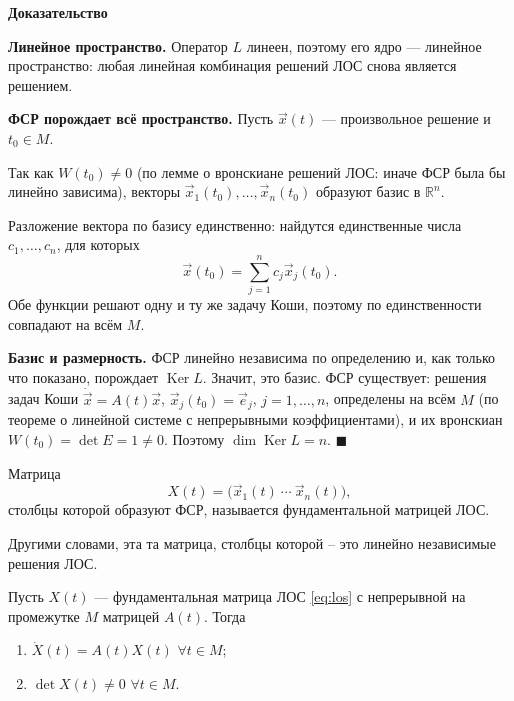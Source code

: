 \documentclass[12pt,a4paper]{article}
\numberwithin{equation}{section}
\newcommand{\vect}[1]{\vec{#1}}
\renewenvironment{proof}[1][Доказательство]{\begin{center}\textbf{#1}\end{center}}{\hfill$\blacksquare$\par}
\begin{document}
\begin{proof}
\textbf{Линейное пространство.} Оператор $L$ линеен, поэтому его ядро --- линейное пространство: любая линейная комбинация решений ЛОС снова является решением.

\textbf{ФСР порождает всё пространство.} Пусть $\vect{x}(t)$ --- произвольное решение и $t_0\in M$.

Так как \(W(t_0)\neq0\) (по лемме о вронскиане решений ЛОС: иначе ФСР была бы линейно зависима), векторы $\vect{x}_1(t_0),\ldots,\vect{x}_n(t_0)$ образуют базис в \(\mathbb{R}^n\).

Разложение вектора по базису единственно: найдутся единственные числа $c_1,\ldots,c_n$, для которых
\[
\vect{x}(t_0)=\sum_{j=1}^{n}c_j\vect{x}_j(t_0).
\]
Обе функции решают одну и ту же задачу Коши, поэтому по единственности совпадают на всём $M$.

\textbf{Базис и размерность.} ФСР линейно независима по определению и, как только что показано, порождает \(\operatorname{Ker}L\). Значит, это базис. ФСР существует: решения задач Коши \(\dot{\vect{x}}=A(t)\vect{x}\), \(\vect{x}_j(t_0)=\vect{e}_j\), \(j=1,\ldots,n\), определены на всём \(M\) (по теореме о линейной системе с непрерывными коэффициентами), и их вронскиан \(W(t_0)=\det E=1\neq0\). Поэтому \(\dim\operatorname{Ker}L=n\).
\end{proof}

\begin{definitionHSE}
Матрица
\[
X(t)=\bigl(\vect{x}_1(t)\ \cdots\ \vect{x}_n(t)\bigr),
\]
столбцы которой образуют ФСР, называется фундаментальной матрицей ЛОС.
\end{definitionHSE}
Другими словами, эта та матрица, столбцы которой -- это линейно независимые решения ЛОС.

\begin{theoremHSE}
Пусть $X(t)$ --- фундаментальная матрица ЛОС \eqref{eq:los} с непрерывной на промежутке $M$ матрицей $A(t)$. Тогда
\begin{enumerate}
\item \(\dot X(t)=A(t)X(t)\) \(\forall t\in M\);
\item \(\det X(t)\neq0\) \(\forall t\in M\).
\end{enumerate}
\end{theoremHSE}
\end{document}
